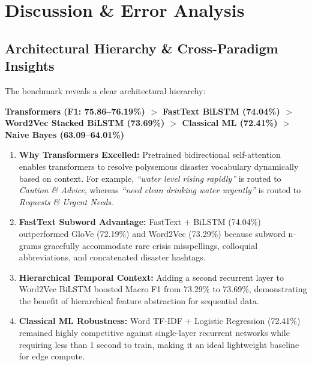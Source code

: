 \documentclass[12pt,a4paper]{article}
\begin{document}
\section{Discussion \& Error Analysis}

\subsection{Architectural Hierarchy \& Cross-Paradigm Insights}
The benchmark reveals a clear architectural hierarchy:
\begin{center}
\textbf{Transformers (F1: 75.86--76.19\%) $>$ FastText BiLSTM (74.04\%) $>$ Word2Vec Stacked BiLSTM (73.69\%) $>$ Classical ML (72.41\%) $>$ Naive Bayes (63.09--64.01\%)}
\end{center}

\begin{enumerate}
    \item \textbf{Why Transformers Excelled:} Pretrained bidirectional self-attention enables transformers to resolve polysemous disaster vocabulary dynamically based on context. For example, \textit{``water level rising rapidly''} is routed to \textit{Caution \& Advice}, whereas \textit{``need clean drinking water urgently''} is routed to \textit{Requests \& Urgent Needs}.
    \item \textbf{FastText Subword Advantage:} FastText + BiLSTM (74.04\%) outperformed GloVe (72.19\%) and Word2Vec (73.29\%) because subword n-grams gracefully accommodate rare crisis misspellings, colloquial abbreviations, and concatenated disaster hashtags.
    \item \textbf{Hierarchical Temporal Context:} Adding a second recurrent layer to Word2Vec BiLSTM boosted Macro F1 from 73.29\% to 73.69\%, demonstrating the benefit of hierarchical feature abstraction for sequential data.
    \item \textbf{Classical ML Robustness:} Word TF-IDF + Logistic Regression (72.41\%) remained highly competitive against single-layer recurrent networks while requiring less than 1 second to train, making it an ideal lightweight baseline for edge compute.
\end{enumerate}
\end{document}

